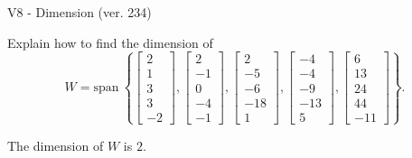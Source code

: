 \begin{exercise}
  \begin{exerciseTitle}V8 - Dimension (ver. 234)\end{exerciseTitle}
  \begin{exerciseStatement}
    Explain how to find the dimension of 
\[W=\mathrm{span}\ \left\{\left[\begin{array}{r}
2 \\
1 \\
3 \\
3 \\
-2
\end{array}\right] , \left[\begin{array}{r}
2 \\
-1 \\
0 \\
-4 \\
-1
\end{array}\right] , \left[\begin{array}{r}
2 \\
-5 \\
-6 \\
-18 \\
1
\end{array}\right] , \left[\begin{array}{r}
-4 \\
-4 \\
-9 \\
-13 \\
5
\end{array}\right] , \left[\begin{array}{r}
6 \\
13 \\
24 \\
44 \\
-11
\end{array}\right]\right\}.\]



  \end{exerciseStatement}
  \begin{exerciseAnswer}
   The dimension of \(W\) is  \(2\).
  


  \end{exerciseAnswer}
\end{exercise}